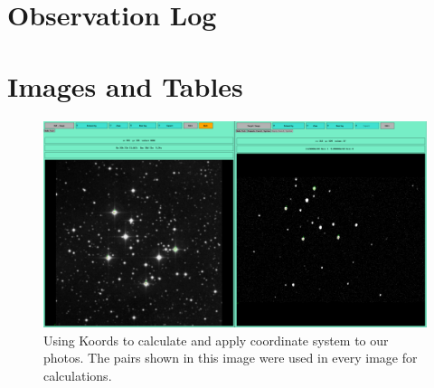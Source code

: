 \documentclass[%
aip,
jmp,
reprint,
floatfix,
nofootinbib
]{revtex4-1}
\begin{document}

	\onecolumngrid
	\appendix
	\section{Observation Log}

	\begin{table}[H]
		\centering
		
		\label{table:log}
	\end{table}	

	\section{Images and Tables} 
	
	\begin{figure}[H]
		\centering
		\includegraphics[width=\textwidth]{figs/koords.png}
		\caption{Using Koords to calculate and apply coordinate system to our photos. The pairs shown in this image were used in every image for calculations.}
		\label{fig:koords}
	\end{figure}
	
\end{document}
